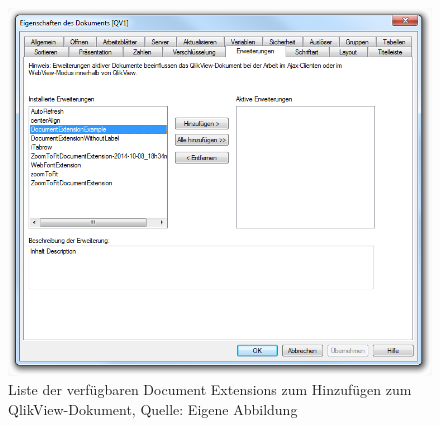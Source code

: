 \begin{appendix}
\ifIncludeFigures\begin{figure}[htbp]
	\centering
		\includegraphics[width=1.00\textwidth]{./img/DocumentExtensionListe/DocumentExtensionListe.png}
	\caption[Liste der verfügbaren Document Extensions]{Liste der verfügbaren Document Extensions zum Hinzufügen zum QlikView-Dokument, Quelle: Eigene Abbildung}
	\label{fig:DocumentExtensionListe}
\end{figure}\fi





\end{appendix}
